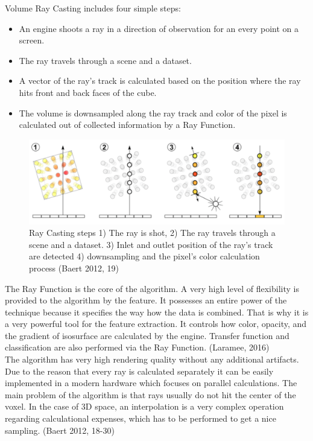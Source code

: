 \documentclass[twoside, english, 11pt]{report}
\begin{document}
Volume Ray Casting includes four simple steps:
\begin{itemize} \item An engine shoots a ray in a direction of observation for an every point on a screen.
\item The ray travels through a scene and a dataset.
\item A vector of the ray's track is calculated based on the position where the ray hits front and back faces of the cube.
\item The volume is downsampled along the ray track and color of the pixel is calculated out of collected information by a Ray Function.
\end{itemize}
\begin{figure}[!h]
\centerline{\includegraphics[scale=0.35]{img/rayCast}}
\caption{Ray Casting steps 1) The ray is shot, 2) The ray travels through a scene and a dataset. 3) Inlet and outlet position of the ray's track are detected 4) downsampling and the pixel's color calculation process (Baert 2012, 19)}
\end{figure}

The Ray Function is the core of the algorithm. A very high level of flexibility is provided to the algorithm by the feature. It possesses an entire power of the technique because it specifies the way how the data is combined. That is why it is a very powerful tool for the feature extraction. It controls how color, opacity, and the gradient of isosurface are calculated by the engine. Transfer function and classification are also performed via the Ray Function. (Laramee, 2016)\\

The algorithm has very high rendering quality without any additional artifacts. Due to the reason that every ray is calculated separately it can be easily implemented in a modern hardware which focuses on parallel calculations. The main problem of the algorithm is that rays usually do not hit the center of the voxel. In the case of 3D space, an interpolation is a very complex operation regarding calculational expenses, which has to be performed to get a nice sampling. (Baert 2012, 18-30)
\end{document}
